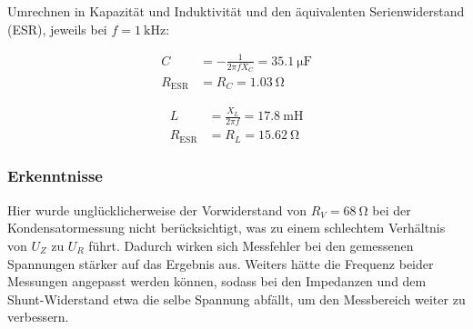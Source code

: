 \medskip
Umrechnen in Kapazität und Induktivität und den äquivalenten Serienwiderstand (ESR), jeweils bei $f=\SI{1}{\kilo\hertz}$:

\begin{minipage}[position]{0.48\textwidth}
	\[
		\begin{aligned}
			C                & = -\frac{1}{2\pi f X_C} = \SI{35.1}{\micro\farad} \\
			R_{\mathrm{ESR}} & = R_C = \SI{1.03}{\ohm}
		\end{aligned}
	\]
\end{minipage}\hfill
\begin{minipage}[position]{0.48\textwidth}
	\[
		\begin{aligned}
			L                & = \frac{X_L}{2\pi f} = \SI{17.8}{\milli\henry} \\
			R_{\mathrm{ESR}} & = R_L = \SI{15.62}{\ohm}
		\end{aligned}
	\]
\end{minipage}

\subsubsection{Erkenntnisse}

Hier wurde unglücklicherweise der Vorwiderstand von $R_V=\SI{68}{\ohm}$ bei der
Kondensatormessung nicht berücksichtigt, was zu einem schlechtem Verhältnis von
$U_Z$ zu $U_R$ führt. Dadurch wirken sich Messfehler bei den gemessenen
Spannungen stärker auf das Ergebnis aus. Weiters hätte die Frequenz beider
Messungen angepasst werden können, sodass bei den Impedanzen und dem
Shunt-Widerstand etwa die selbe Spannung abfällt, um den Messbereich weiter zu
verbessern.

